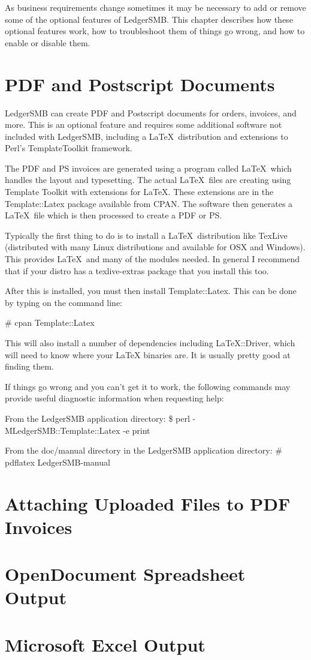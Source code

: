 As business requirements change sometimes it may be necessary to add or remove
some of the optional features of LedgerSMB.  This chapter describes how these
optional features work, how to troubleshoot them of things go wrong, and how to
enable or disable them.

\section{PDF and Postscript Documents}

LedgerSMB can create PDF and Postscript documents for orders, invoices, and
more.  This is an optional feature and requires some additional software not
included with LedgerSMB, including a \LaTeX\ distribution and extensions to 
Perl's TemplateToolkit framework.

The PDF and PS invoices are generated using a program called \LaTeX\
which handles the layout and typesetting.  The actual \LaTeX\ files are
creating using Template Toolkit with extensions for \LaTeX.  These
extensions are in the Template::Latex package available from CPAN.
The software then generates a \LaTeX\ file which is then processed to
create a PDF or PS.

Typically the first thing to do is to install a \LaTeX\ distribution
like TexLive (distributed with many Linux distributions and available
for OSX and Windows).  This provides \LaTeX\ and many of the modules
needed.   In general I recommend that if your distro has a
texlive-extras package that you install this too.

After this is installed, you must then install Template::Latex.  This
can be done by typing on the command line:

\# cpan Template::Latex

This will also install a number of dependencies including
LaTeX::Driver, which will need to know where your LaTeX binaries are.
It is usually pretty good at finding them.

If things go wrong and you can't get it to work, the following
commands may provide useful diagnostic information when requesting
help:

From the LedgerSMB application directory:
\$ perl -MLedgerSMB::Template::Latex -e print

From the doc/manual directory in the LedgerSMB application directory:
\# pdflatex LedgerSMB-manual

\section{Attaching Uploaded Files to PDF Invoices}

\section{OpenDocument Spreadsheet Output}

\section{Microsoft Excel Output}


